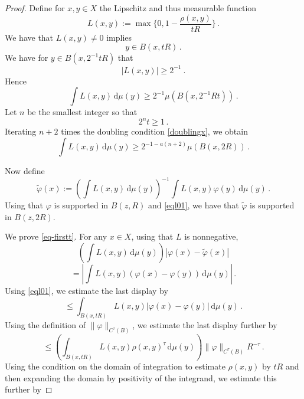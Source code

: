 \begin{proof}
   Define for $x,y\in X$ the Lipschitz and thus measurable function
     \begin{equation}
           L(x,y) := \max\{0, 1 - \frac{\rho(x,y)}{tR}\}\, .
    \end{equation}
We have that $L(x,y)\neq 0$ implies
\begin{equation}\label{eql01}
    y\in B(x, tR)\, .
\end{equation}
We have for $y\in B(x, 2^{-1}tR)$ that
\begin{equation}\label{eql30}
           |L(x,y)|\ge 2^{-1} \ .
    \end{equation}
Hence
\begin{equation}
        \int L(x,y) \, \mathrm{d}\mu(y)\ge 2^{-1}\mu(B(x, 2^{-1}Rt))\, .
    \end{equation}
 Let $n$ be the smallest integer so that
 \begin{equation}\label{2nt1}
     2^nt\ge 1\, .
 \end{equation} Iterating $n+2$ times the doubling condition \eqref{doublingx}, we obtain
      \begin{equation}\label{eql32}
        \int L(x,y) \, \mathrm{d}\mu(y)\ge 2^{-1-a(n+2)}\mu(B(x, 2R))\, .
    \end{equation}

Now define
    $$
        \tilde \varphi(x) := \left(\int L(x,y) \, \mathrm{d}\mu(y)\right)^{-1}\int L(x,y) \varphi(y) \, \mathrm{d}\mu(y)\, .
    $$
Using that $\varphi$ is supported in $B(z,R)$ and
\eqref{eql01}, we have that $\tilde{\varphi}$ is supported in $B(z,2R)$.

We prove \eqref{eq-firstt}.
 For any $x\in X$, using
    that $L$ is nonnegative,
    \begin{equation}\label{eql1}
    \left(\int L(x,y) \, \mathrm{d}\mu(y)\right)
        |\varphi(x) - \tilde \varphi(x)|
    \end{equation}
 \begin{equation}\label{eql2}
 = \left| \int L(x,y)(\varphi(x) - \varphi(y)) \, \mathrm{d}\mu(y)\right|\, .
    \end{equation}
Using \eqref{eql01}, we estimate the last display by
 \begin{equation}\label{eql3}
         \le \int_{B(x, tR)} L(x,y)|\varphi(x) - \varphi(y)| \, \mathrm{d}\mu(y)\, .\end{equation}
  Using the definition of $\|\varphi\|_{C^\tau(B)}$, we estimate the last display further by
        \begin{equation}\label{eql4}
         \le \left(\int_{B(x, tR)} L(x,y)
          \rho(x,y)^\tau \, \mathrm{d}\mu(y) \right)\|\varphi\|_{C^\tau(B)}R^{-\tau}\, .
    \end{equation}
  Using the condition on the domain of integration to estimate $\rho(x,y)$ by $tR$ and then expanding the domain by positivity of the integrand, we estimate this further by


\end{proof}
